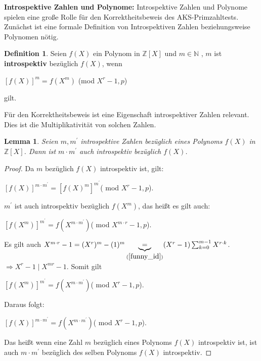 \documentclass[12pt,oneside]{article}
\newtheorem{lemma}[theorem]{Lemma}
\theoremstyle{remark}
\theoremstyle{definition}
\newtheorem{definition}{Definition}[section]
\begin{document}
\textbf{Introspektive Zahlen und Polynome:}
Introspektive Zahlen und Polynome spielen eine große Rolle für den Korrektheitsbeweis des AKS-Primzahltests. Zunächst ist eine formale Definition von Introspektiven Zahlen beziehungsweise Polynomen nötig.

\begin{definition}
Seien $f(X)$ ein Polynom in $\mathbb{Z}[X]$ und $m \in \mathbb{N}$ , $m$ ist \textbf{introspektiv} bezüglich $f(X)$, wenn\newline\newline
    \centerline{$[f(X)]^{m} = f(X^m)$ (mod $X^r - 1,p$)} 
gilt. 
\end{definition}

Für den Korrektheitsbeweis ist eine Eigenschaft introspektiver Zahlen relevant. Dies ist die Multiplikativität von solchen Zahlen.\newline\newline

\begin{lemma}\label{intros_num}
Seien $m,m^{'}$ introspektive Zahlen bezüglich eines Polynoms $f(X)$ in $\mathbb{Z}[X]$. Dann ist $m \cdot m^{'}$ auch introspektiv bezüglich $f(X)$.
\end{lemma}

\begin{proof}
Da $m$ bezüglich $f(X)$ introspektiv ist, gilt:\newline\newline
\centerline{$[f(X)]^{m \cdot m^{'}} = [f(X)^{m}]^{m^{'}}$( mod $X^r - 1, p$).}\newline\newline
$m^{'}$ ist auch introspektiv bezüglich $f(X^{m})$, das heißt es gilt auch:\newline\newline
\centerline{$[f(X^m)]^{m^{'}} = f(X^{m \cdot m^{'}})$( mod $X^{m\cdot r} - 1, p$).}\newline\newline

Es gilt auch $X^{m \cdot r } - 1 = (X^{r})^{m} - (1)^m \underbrace{=}_{(\ref{funny_id})} (X^{r} - 1) \sum_{k = 0}^{m-1} X^{r \cdot k}$.\newline\newline$\Rightarrow X^{r} - 1\mid X^{mr} - 1$. Somit gilt\newline\newline
\centerline{$[f(X^m)]^{m^{'}} = f(X^{m \cdot m^{'}})$( mod $X^{r} - 1,p$).}\newline

Daraus folgt:\newline\newline
\centerline{$[f(X)]^{m \cdot m^{'}} = f(X^{m \cdot m^{'}}) $( mod $X^r - 1, p$).}\newline

Das heißt wenn eine Zahl $m$ bezüglich eines Polynoms $f(X)$ introspektiv ist, ist auch $m \cdot m^{'}$ bezüglich des selben Polynoms $f(X)$ introspektiv. 
\end{proof}
\end{document}
